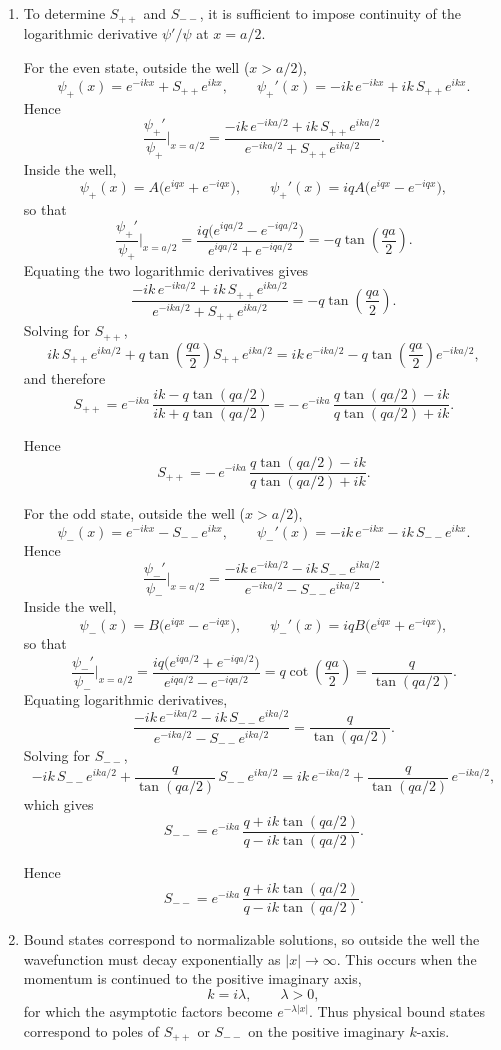 \documentclass[12pt]{article}
\begin{document}
\begin{enumerate}[label=(\alph*)]
\item To determine \(S_{++}\) and \(S_{--}\), it is sufficient to impose continuity of the logarithmic derivative \(\psi'/\psi\) at \(x=a/2\).

For the even state, outside the well (\(x>a/2\)),
\[
\psi_+(x)=e^{-ikx}+S_{++}e^{ikx},
\qquad
\psi_+'(x)=-ik\,e^{-ikx}+ik\,S_{++}e^{ikx}.
\]
Hence
\[
\frac{\psi_+'}{\psi_+}\Big|_{x=a/2}
=
\frac{-ik\,e^{-ika/2}+ik\,S_{++}e^{ika/2}}
     {e^{-ika/2}+S_{++}e^{ika/2}}.
\]
Inside the well,
\[
\psi_+(x)=A\bigl(e^{iqx}+e^{-iqx}\bigr),
\qquad
\psi_+'(x)=iqA\bigl(e^{iqx}-e^{-iqx}\bigr),
\]
so that
\[
\frac{\psi_+'}{\psi_+}\Big|_{x=a/2}
=
\frac{iq\bigl(e^{iqa/2}-e^{-iqa/2}\bigr)}
     {e^{iqa/2}+e^{-iqa/2}}
=
-q\tan\!\left(\frac{qa}{2}\right).
\]
Equating the two logarithmic derivatives gives
\[
\frac{-ik\,e^{-ika/2}+ik\,S_{++}e^{ika/2}}
     {e^{-ika/2}+S_{++}e^{ika/2}}
=
-q\tan\!\left(\frac{qa}{2}\right).
\]
Solving for \(S_{++}\),
\[
ik\,S_{++}e^{ika/2}+q\tan\!\left(\frac{qa}{2}\right)S_{++}e^{ika/2}
=
ik\,e^{-ika/2}-q\tan\!\left(\frac{qa}{2}\right)e^{-ika/2},
\]
and therefore
\[
S_{++}
=
e^{-ika}\,
\frac{ik-q\tan(qa/2)}{ik+q\tan(qa/2)}
=
-\,e^{-ika}\,
\frac{q\tan(qa/2)-ik}{q\tan(qa/2)+ik}.
\]

Hence
\[
\boxed{
S_{++}
=
-\,e^{-ika}\,
\frac{q\tan(qa/2)-ik}{q\tan(qa/2)+ik}
}.
\]

For the odd state, outside the well (\(x>a/2\)),
\[
\psi_-(x)=e^{-ikx}-S_{--}e^{ikx},
\qquad
\psi_-'(x)=-ik\,e^{-ikx}-ik\,S_{--}e^{ikx}.
\]
Hence
\[
\frac{\psi_-'}{\psi_-}\Big|_{x=a/2}
=
\frac{-ik\,e^{-ika/2}-ik\,S_{--}e^{ika/2}}
     {e^{-ika/2}-S_{--}e^{ika/2}}.
\]
Inside the well,
\[
\psi_-(x)=B\bigl(e^{iqx}-e^{-iqx}\bigr),
\qquad
\psi_-'(x)=iqB\bigl(e^{iqx}+e^{-iqx}\bigr),
\]
so that
\[
\frac{\psi_-'}{\psi_-}\Big|_{x=a/2}
=
\frac{iq\bigl(e^{iqa/2}+e^{-iqa/2}\bigr)}
     {e^{iqa/2}-e^{-iqa/2}}
=
q\cot\!\left(\frac{qa}{2}\right)
=
\frac{q}{\tan(qa/2)}.
\]
Equating logarithmic derivatives,
\[
\frac{-ik\,e^{-ika/2}-ik\,S_{--}e^{ika/2}}
     {e^{-ika/2}-S_{--}e^{ika/2}}
=
\frac{q}{\tan(qa/2)}.
\]
Solving for \(S_{--}\),
\[
-ik\,S_{--}e^{ika/2}+\frac{q}{\tan(qa/2)}\,S_{--}e^{ika/2}
=
ik\,e^{-ika/2}+\frac{q}{\tan(qa/2)}\,e^{-ika/2},
\]
which gives
\[
S_{--}
=
e^{-ika}\,
\frac{q+ik\tan(qa/2)}{q-ik\tan(qa/2)}.
\]

Hence
\[
\boxed{
S_{--}
=
e^{-ika}\,
\frac{q+ik\tan(qa/2)}{q-ik\tan(qa/2)}
}.
\]

\item Bound states correspond to normalizable solutions, so outside the well the wavefunction must decay exponentially as \(|x|\to\infty\). This occurs when the momentum is continued to the positive imaginary axis,
\[
k=i\lambda,
\qquad
\lambda>0,
\]
for which the asymptotic factors become \(e^{-\lambda|x|}\). Thus physical bound states correspond to poles of \(S_{++}\) or \(S_{--}\) on the positive imaginary \(k\)-axis.


\end{enumerate}
\end{document}
